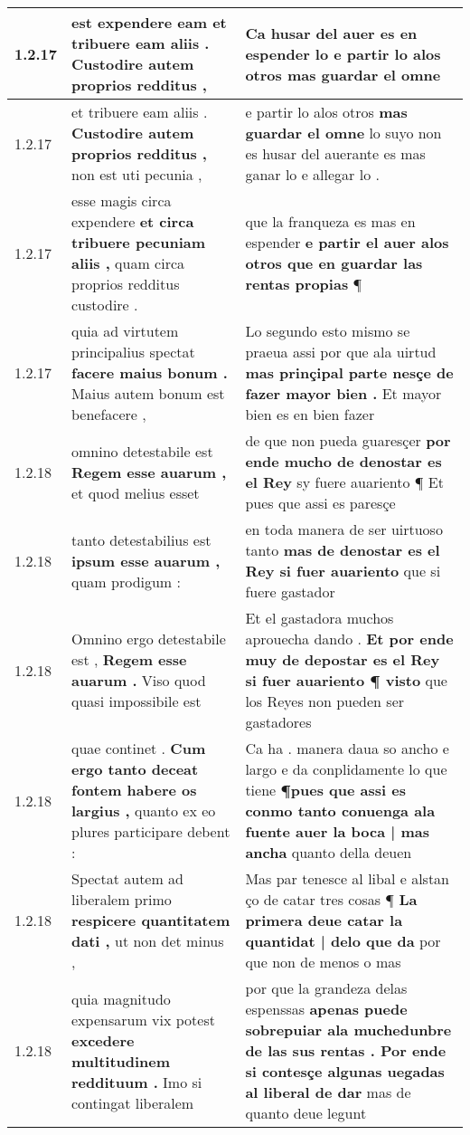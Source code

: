 \begin{tabular}{|p{1cm}|p{6.5cm}|p{6.5cm}|}
1.2.17 & est expendere eam \textbf{ et tribuere eam aliis . } Custodire autem proprios redditus , & Ca husar del auer es en espender lo \textbf{ e partir lo alos otros } mas guardar el omne \\\hline
1.2.17 & et tribuere eam aliis . \textbf{ Custodire autem proprios redditus , } non est uti pecunia , & e partir lo alos otros \textbf{ mas guardar el omne } lo suyo non es husar del auerante es mas ganar lo e allegar lo . \\\hline
1.2.17 & esse magis circa expendere \textbf{ et circa tribuere pecuniam aliis , } quam circa proprios redditus custodire . & que la franqueza es mas en espender \textbf{ e partir el auer alos otros que en guardar las rentas propias } ¶ \\\hline
1.2.17 & quia ad virtutem principalius spectat \textbf{ facere maius bonum . } Maius autem bonum est benefacere , & Lo segundo esto mismo se praeua assi por que ala uirtud \textbf{ mas prinçipal parte nesçe de fazer mayor bien . } Et mayor bien es en bien fazer \\\hline
1.2.18 & omnino detestabile est \textbf{ Regem esse auarum , } et quod melius esset & de que non pueda guaresçer \textbf{ por ende mucho de denostar es el Rey } sy fuere auariento ¶ Et pues que assi es paresçe \\\hline
1.2.18 & tanto detestabilius est \textbf{ ipsum esse auarum , } quam prodigum : & en toda manera de ser uirtuoso tanto \textbf{ mas de denostar es el Rey si fuer auariento } que si fuere gastador \\\hline
1.2.18 & Omnino ergo detestabile est , \textbf{ Regem esse auarum . } Viso quod quasi impossibile est & Et el gastadora muchos aprouecha dando . \textbf{ Et por ende muy de depostar es el Rey si fuer auariento ¶ visto } que los Reyes non pueden ser gastadores \\\hline
1.2.18 & quae continet . \textbf{ Cum ergo tanto deceat fontem habere os largius , } quanto ex eo plures participare debent : & Ca ha . manera daua so ancho e largo e da conplidamente lo que tiene \textbf{ ¶pues que assi es conmo tanto conuenga ala fuente auer la boca | mas ancha } quanto della deuen \\\hline
1.2.18 & Spectat autem ad liberalem primo \textbf{ respicere quantitatem dati , } ut non det minus , & Mas par tenesce al libal e alstan ço de catar tres cosas ¶ \textbf{ La primera deue catar la quantidat | delo que da } por que non de menos o mas \\\hline
1.2.18 & quia magnitudo expensarum vix potest \textbf{ excedere multitudinem reddituum . } Imo si contingat liberalem & por que la grandeza delas espenssas \textbf{ apenas puede sobrepuiar ala muchedunbre de las sus rentas . Por ende si contesçe algunas uegadas al liberal de dar } mas de quanto deue legunt \\\hline

\end{tabular}

